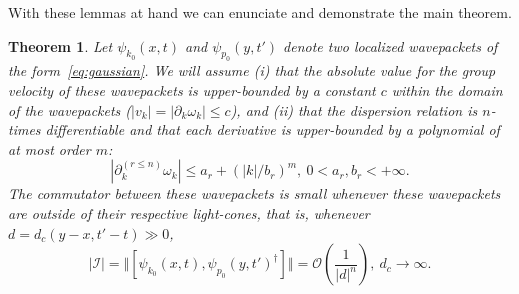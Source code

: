 \documentclass[notitlepage, prx, preprint, amsmath,superscriptaddress,amssymb]{revtex4-1}
\newtheorem{theorem}{Theorem}[section]
\begin{document}
With these lemmas at hand we can enunciate and demonstrate the main theorem.

\begin{theorem}
\label{th:free-causality}
Let $\psi_{k_0}(x,t)$ and $\psi_{p_0}(y,t')$ denote two localized wavepackets of the form\ \eqref{eq:gaussian}. We will assume (i) that the  absolute value for the group velocity of these wavepackets is upper-bounded by a constant $c$ within the domain of the wavepackets ($ |v_k| = |\partial_k \omega_k |  \leq c$), and (ii) that the dispersion relation is $n$-times differentiable and that each derivative is upper-bounded by a polynomial of at most order $m$:
\begin{equation}
|\partial^{(r\leq n)}_k\omega_k|\leq a_r + (|k|/b_r)^m,~0< a_r,b_r<+\infty.
\end{equation}
The commutator between these wavepackets is small whenever these wavepackets are outside of their respective light-cones, that is, whenever $d=d_c(y-x,t'-t)\gg 0$, 
\begin{equation}
|\mathcal{I}|=\Vert[\psi_{k_0}(x,t),\psi_{p_0}(y,t')^\dagger]\Vert =
\mathcal{O}\left(\frac{1}{|d|^n}\right),~d_c\to\infty.
\end{equation}
\end{theorem}
\end{document}
